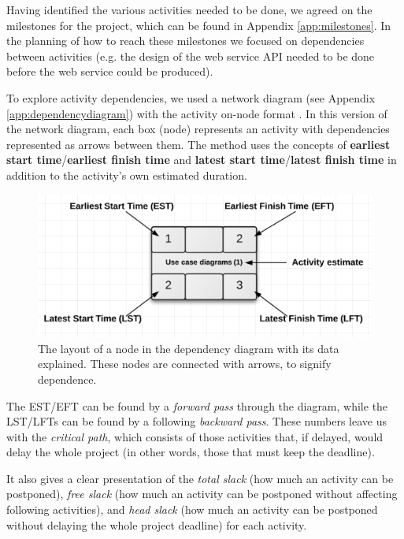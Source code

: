 Having identified the various activities needed to be done, we agreed on the milestones for the project, which can be found in Appendix \ref{app:milestones}.
In the planning of how to reach these milestones we focused on dependencies
between activities (e.g. the design of the web service API needed to be done before the
web service could be produced).

To explore activity dependencies, we used a network diagram (see Appendix
\ref{app:dependencydiagram}) with the activity on-node
format\cite[ch.~8.5]{caye} . In this version of the network diagram, each box
(node) represents an activity with dependencies represented as arrows between
them. The method uses the concepts of \textbf{earliest start
time}/\textbf{earliest finish time} and \textbf{latest start
time}/\textbf{latest finish time} in addition to the activity’s own estimated
duration.

\begin{figure}[hbtp]
\centering
\includegraphics[scale=0.5]{./Empiri/Planning/img/networkdiagramnotation.png}
\caption{The layout of a node in the dependency diagram with its data explained. These nodes are connected with arrows, to signify dependence.}
\end{figure}
 
The EST/EFT can be found by a \emph{forward pass} through the diagram, while the LST/LFTs
can be found by a following \emph{backward pass}. These numbers leave us with the
\emph{critical path}, which consists of those activities that, if delayed, would delay
the whole project (in other words, those that must keep the deadline).

It also gives a clear presentation of the \emph{total slack} (how much an activity can
be postponed), \emph{free slack} (how much an activity can be postponed without affecting
following activities), and \emph{head slack} (how much an activity can be postponed without
delaying the whole project deadline) for each activity.
